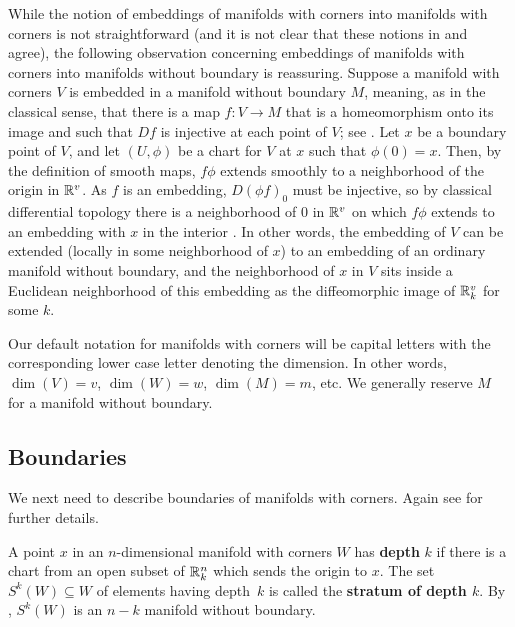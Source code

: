 While the notion of embeddings of manifolds with corners into manifolds with corners is not straightforward (and it is not clear that these notions in \cite{Joy12} and \cite{MaDo92} agree), the following observation concerning embeddings of manifolds with corners into manifolds without boundary is reassuring. 
Suppose a manifold with corners $V$ is embedded in a manifold without boundary $M$, meaning, as in the classical sense, that there is a map $f \colon V \to M$ that is a homeomorphism onto its image and such that $Df$ is injective at each point of $V$; see \cite[Definition 3.3.1 and Theorem 3.2.6]{MaDo92}. 
Let $x$ be a boundary point of $V$, and let $(U,\phi)$ be a chart for $V$ at $x$ such that $\phi(0)=x$.
Then, by the definition of smooth maps, $f \phi$ extends smoothly to a neighborhood of the origin in $\mathbb{R}^v$.
As $f$ is an embedding, $D(\phi f)_0$ must be injective, so by classical differential topology there is a neighborhood of $0$ in $\mathbb{R}^v$ on which $f\phi$ extends to an embedding with $x$ in the interior \cite[Section 1.3]{GuPo74}. 
In other words, the embedding of $V$ can be extended (locally in some neighborhood of $x$) to an embedding of an ordinary manifold without boundary, and the neighborhood of $x$ in $V$ sits inside a Euclidean neighborhood of this embedding as the diffeomorphic image of $\mathbb{R}^v_k$ for some $k$. 
 

\begin{notation}
	Our default notation for manifolds with corners will be capital letters with the corresponding lower case letter denoting the dimension.
	In other words, $\dim(V) = v$, $\dim(W) = w$, $\dim(M) = m$, etc.
	We generally reserve $M$ for a manifold without boundary.
\end{notation}

\subsection{Boundaries}\label{S: boundaries}

We next need to describe boundaries of manifolds with corners.
Again see \cite[Section 2]{Joy12} for further details.

\begin{definition}
	A point $x$ in an $n$-dimensional manifold with corners $W$ has \textbf{depth} $k$ if there is a chart from an open subset of $\mathbb{R}^n_k$ which sends the origin to $x$.
	The set $S^k(W) \subseteq W$ of elements having depth~$k$ is called the \textbf{stratum of depth $k$}.
	By \cite[Proposition 2.4.]{Joy12}, $S^k(W)$ is an $n-k$ manifold without boundary.
\end{definition}

